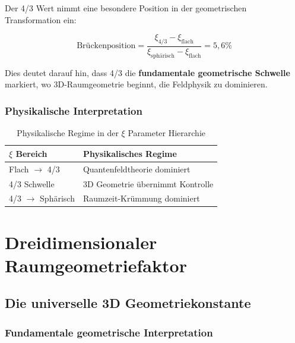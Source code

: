 	Der 4/3 Wert nimmt eine besondere Position in der geometrischen Transformation ein:
	
	\begin{equation}
		\text{Brückenposition} = \frac{\xi_{4/3} - \xi_{\text{flach}}}{\xi_{\text{sphärisch}} - \xi_{\text{flach}}} = 5{,}6\%
		\label{eq:brueckenposition}
	\end{equation}
	
	Dies deutet darauf hin, dass 4/3 die \textbf{fundamentale geometrische Schwelle} markiert, wo 3D-Raumgeometrie beginnt, die Feldphysik zu dominieren.
	
	\subsubsection{Physikalische Interpretation}
	\label{subsubsec:physikalische_interpretation}
	
	\begin{table}[htbp]
		\centering
		\begin{tabular}{ll}
			\toprule
			\textbf{$\xi$ Bereich} & \textbf{Physikalisches Regime} \\
			\midrule
			Flach $\rightarrow$ 4/3 & Quantenfeldtheorie dominiert \\
			4/3 Schwelle & 3D Geometrie übernimmt Kontrolle \\
			4/3 $\rightarrow$ Sphärisch & Raumzeit-Krümmung dominiert \\
			\bottomrule
		\end{tabular}
		\caption{Physikalische Regime in der $\xi$ Parameter Hierarchie}
		\label{tab:physikalische_regime}
	\end{table}
	
	\section{Dreidimensionaler Raumgeometriefaktor}
	\label{sec:3d_geometriefaktor}
	
	\subsection{Die universelle 3D Geometriekonstante}
	\label{subsec:universelle_3d_konstante}
	
	\subsubsection{Fundamentale geometrische Interpretation}
	\label{subsubsec:fundamentale_interpretation}
	
